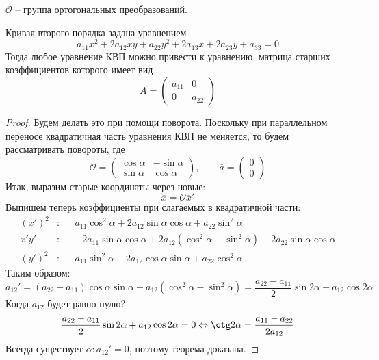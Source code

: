 \begin{notation}
	$\mathcal{O}$ -- группа ортогональных преобразований.
\end{notation}


\begin{Thm}
	Кривая второго порядка задана уравнением
	\[a_{11} x^2 + 2a_{12} xy + a_{22} y^2 + 2a_{13} x + 2a_{23} y + a_{33} = 0\]
	Тогда любое уравнение КВП можно привести к уравнению, матрица старших коэффициентов которого имеет вид
	\[A = \left(\begin{array}{cc}
	a_{11} & 0 \\ 
	0 & a_{22}
	\end{array}\right)\] 
\end{Thm}

\begin{proof}
	Будем делать это при помощи поворота. Поскольку при параллельном переносе квадратичная часть уравнения КВП не меняется, то будем рассматривать повороты, где 
	\[\mathcal{O} = \left(\begin{array}{cc}
	\cos \alpha & -\sin \alpha \\ 
	\sin \alpha & \cos \alpha
	\end{array}\right), \qquad \overline{a} = \left(\begin{array}{c}
	0 \\ 
	0
	\end{array}\right)\]
	Итак, выразим старые координаты через новые:
	\[\overline{x} = \mathcal{O} \overline{x}'\]
	Выпишем теперь коэффициенты при слагаемых в квадратичной части:
	\begin{align*}
		(x')^2 &: &&a_{11} \cos^2 \alpha + 2 a_{12}\sin \alpha \cos \alpha + a_{22} \sin^2 \alpha \\
		x'y' &: &&-2a_{11} \sin \alpha \cos \alpha + 2a_{12} (\cos^2 \alpha - \sin^2 \alpha) + 2a_{22} \sin \alpha \cos \alpha \\
		(y')^2 &: &&a_{11} \sin^2 \alpha - 2a_{12} \cos \alpha \sin \alpha + a_{22} \cos^2 \alpha
	\end{align*}
	Таким образом:
	\[a_{12}' = (a_{22} - a_{11}) \cos \alpha \sin \alpha + a_{12} (\cos^2 \alpha - \sin^2 \alpha) = \frac{a_{22} - a_{11}}{2}\sin 2\alpha + a_{12} \cos 2 \alpha\]
	Когда $a_{12}$ будет равно нулю?
	\[\frac{a_{22} - a_{11}}{2}\sin 2\alpha + a_{12} \cos 2 \alpha = 0 \EQ \ctg 2\alpha = \frac{a_{11} - a_{22}}{2a_{12}}\] 
	Всегда существует $\alpha : a_{12}' = 0$, поэтому теорема доказана.  
\end{proof}

